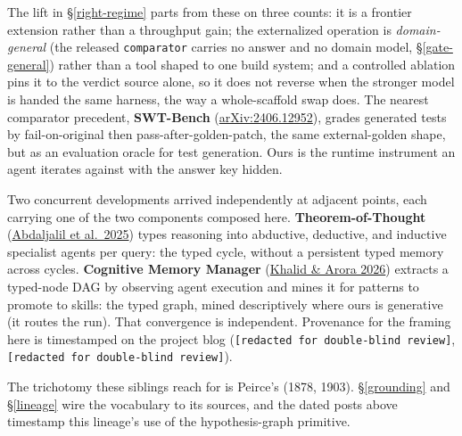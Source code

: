 \documentclass[
  10pt,
]{article}
\begin{document}
The lift in \S\ref{right-regime} parts from these on three counts: it is
a frontier extension rather than a throughput gain; the externalized
operation is \emph{domain-general} (the released \texttt{comparator}
carries no answer and no domain model, \S\ref{gate-general}) rather than
a tool shaped to one build system; and a controlled ablation pins it to
the verdict source alone, so it does not reverse when the stronger model
is handed the same harness, the way a whole-scaffold swap does. The
nearest comparator precedent, \textbf{SWT-Bench}
(\href{https://arxiv.org/abs/2406.12952}{arXiv:2406.12952}), grades
generated tests by fail-on-original then pass-after-golden-patch, the
same external-golden shape, but as an evaluation oracle for test
generation. Ours is the runtime instrument an agent iterates against
with the answer key hidden.

Two concurrent developments arrived independently at adjacent points,
each carrying one of the two components composed here.
\textbf{Theorem-of-Thought}
(\href{https://arxiv.org/abs/2506.07106}{Abdaljalil et al.~2025}) types
reasoning into abductive, deductive, and inductive specialist agents per
query: the typed cycle, without a persistent typed memory across cycles.
\textbf{Cognitive Memory Manager}
(\href{https://openreview.net/forum?id=yCsHQnvvWY}{Khalid \& Arora
2026}) extracts a typed-node DAG by observing agent execution and mines
it for patterns to promote to skills: the typed graph, mined
descriptively where ours is generative (it routes the run). That
convergence is independent. Provenance for the framing here is
timestamped on the project blog
(\texttt{[redacted for double-blind review]},
\texttt{[redacted for double-blind review]}).

The trichotomy these siblings reach for is Peirce's (1878, 1903).
\S\ref{grounding} and \S\ref{lineage} wire the vocabulary to its
sources, and the dated posts above timestamp this lineage's use of the
hypothesis-graph primitive.
\end{document}
